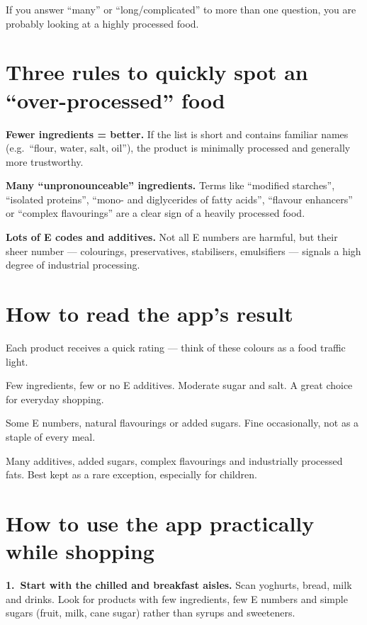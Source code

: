 \documentclass[a5paper,12pt,oneside,openany]{book}
\newcommand{\boxgreen}[2]{%
  \begin{tcolorbox}[boxbase,
    colback=verdescuro!8!white, colframe=verdescuro, title={#1}]
  #2\end{tcolorbox}}
\newcommand{\boxyellow}[2]{%
  \begin{tcolorbox}[boxbase,
    colback=warnyellow!12!white, colframe=warnyellow!80!black, title={#1}]
  #2\end{tcolorbox}}
\newcommand{\boxred}[2]{%
  \begin{tcolorbox}[boxbase,
    colback=warnred!8!white, colframe=warnred, title={#1}]
  #2\end{tcolorbox}}
\begin{document}
If you answer ``many'' or ``long/complicated'' to more than one question,
you are probably looking at a highly processed food.

\section{Three rules to quickly spot an ``over-processed'' food}

\textbf{Fewer ingredients = better.} If the list is short and contains
familiar names (e.g.\ ``flour, water, salt, oil''), the product is minimally
processed and generally more trustworthy.

\textbf{Many ``unpronounceable'' ingredients.} Terms like ``modified
starches'', ``isolated proteins'', ``mono- and diglycerides of fatty acids'',
``flavour enhancers'' or ``complex flavourings'' are a clear sign of a
heavily processed food.

\textbf{Lots of E codes and additives.} Not all E numbers are harmful, but
their sheer number --- colourings, preservatives, stabilisers,
emulsifiers --- signals a high degree of industrial processing.

\section{How to read the app's result}

Each product receives a quick rating --- think of these colours as a food
traffic light.

\boxgreen{Minimally processed --- go ahead}{Few ingredients, few or no
E additives. Moderate sugar and salt. A great choice for everyday
shopping.}

\boxyellow{Moderately processed --- use in moderation}{Some E numbers,
natural flavourings or added sugars. Fine occasionally, not as a staple
of every meal.}

\boxred{Ultra-processed --- limit or avoid}{Many additives, added sugars,
complex flavourings and industrially processed fats. Best kept as a rare
exception, especially for children.}

\section{How to use the app practically while shopping}

\textbf{1.~Start with the chilled and breakfast aisles.} Scan yoghurts,
bread, milk and drinks. Look for products with few ingredients, few
E numbers and simple sugars (fruit, milk, cane sugar) rather than syrups
and sweeteners.
\end{document}

